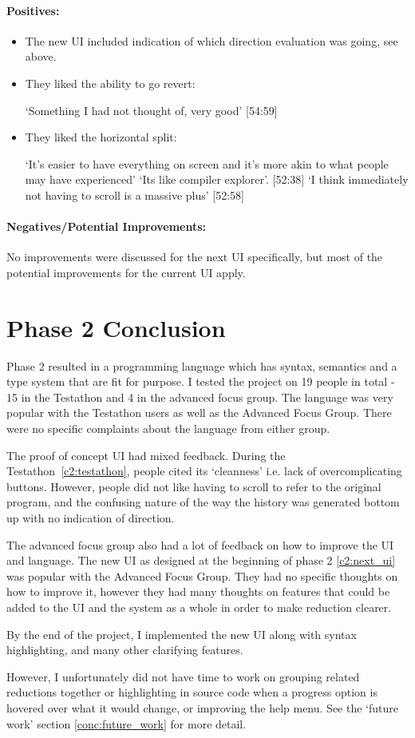 \paragraph{Positives:}
\begin{itemize}
    \item The new UI included indication of which direction evaluation was going, see above. 
    \item They liked the ability to go revert: 
    
    `Something I had not thought of, very good' [54:59]
    \item They liked the horizontal split: 
    
    `It's easier to have everything on screen and it's more akin to what people may have experienced' `Its like compiler explorer'. [52:38] `I think immediately not having to scroll is a massive plus' [52:58]
\end{itemize}

\paragraph{Negatives/Potential Improvements:}
No improvements were discussed for the next UI specifically, but most of the potential improvements for the current UI apply. 

\section{Phase 2 Conclusion}
Phase 2 resulted in a programming language which has syntax, semantics and a type system that are fit for purpose. I tested the project on 19 people in total - 15 in the Testathon and 4 in the advanced focus group. The language was very popular with the Testathon users as well as the Advanced Focus Group. There were no specific complaints about the language from either group. 

The proof of concept UI had mixed feedback. During the Testathon~\ref{c2:testathon}, people cited its `cleanness' i.e. lack of overcomplicating buttons. However, people did not like having to scroll to refer to the original program, and the confusing nature of the way the history was generated bottom up with no indication of direction. 

The advanced focus group also had a lot of feedback on how to improve the UI and language. The new UI as designed at the beginning of phase 2 \ref{c2:next_ui} was popular with the Advanced Focus Group. They had no specific thoughts on how to improve it, however they had many thoughts on features that could be added to the UI and the system as a whole in order to make reduction clearer. 

By the end of the project, I implemented the new UI along with syntax highlighting, and many other clarifying features. 

However, I unfortunately did not have time to work on grouping related reductions together or highlighting in source code when a progress option is hovered over what it would change, or improving the help menu. See the `future work' section \ref{conc:future_work} for more detail. 